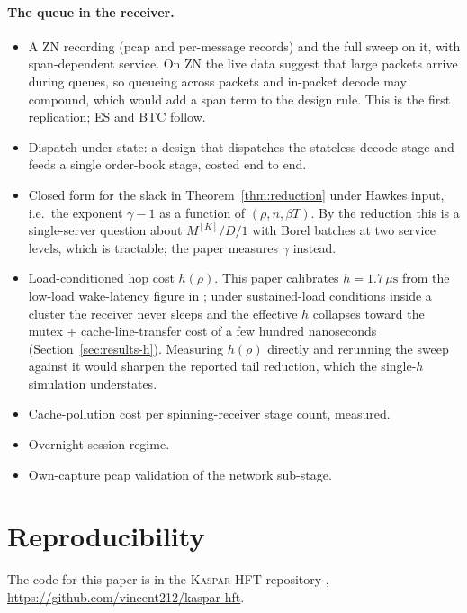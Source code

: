 \documentclass[11pt]{article}
\newcommand{\kasparhft}{\textsc{Kaspar-HFT}}
\begin{document}
\paragraph{The queue in the receiver.}
\begin{itemize}
    \item A ZN recording (pcap and per-message records) and the full sweep on it, with
span-dependent service. On ZN the live data suggest that large packets arrive during
queues, so queueing across packets and in-packet decode may compound, which would add a span
term to the design rule. This is the first replication; ES and BTC follow.
    \item Dispatch under state: a design that dispatches the stateless decode stage and
feeds a single order-book stage, costed end to end.
    \item Closed form for the slack in Theorem~\ref{thm:reduction} under Hawkes input,
i.e.\ the exponent $\gamma - 1$ as a function of $(\rho, n, \beta T)$. By the reduction
this is a single-server question about $M^{[K]}/D/1$ with Borel batches at two service
levels, which is tractable; the paper measures $\gamma$ instead.
    \item Load-conditioned hop cost $h(\rho)$. This paper calibrates $h =
1.7\,\mu\mathrm{s}$ from the low-load wake-latency figure in \citet{mayeski_fastsend};
under sustained-load conditions inside a cluster the receiver never sleeps and the
effective $h$ collapses toward the mutex + cache-line-transfer cost of a few hundred
nanoseconds (Section~\ref{sec:results-h}). Measuring $h(\rho)$ directly and rerunning the
sweep against it would sharpen the reported tail reduction, which the single-$h$
simulation understates.
    \item Cache-pollution cost per spinning-receiver stage count, measured.
    \item Overnight-session regime.
    \item Own-capture pcap validation of the network sub-stage.
\end{itemize}


\section{Reproducibility}
\label{sec:reproducibility}

The code for this paper is in the \kasparhft{} repository \citep{kaspar_repo},
\url{https://github.com/vincent212/kaspar-hft}.
\end{document}
